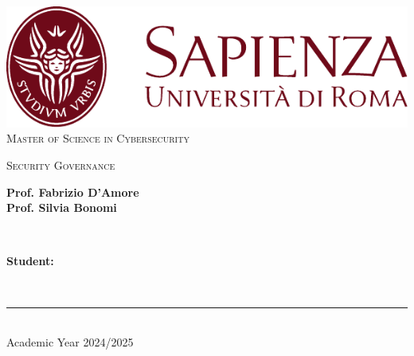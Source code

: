 \begin{titlepage}
	\centering
    \vspace*{0.5 cm}
    \includegraphics[scale = 0.75]{SapienzaLogo.pdf}\\[1.0 cm]	%

    \vspace*{-0.4cm}
    \textsc{\large Master of Science in Cybersecurity}\\[2.0 cm]	%
    \vspace*{1cm}

    { \fontsize{20.74pt}{18.5pt}\selectfont\bfseries \thetitle \par } %

    \vspace*{0.75cm}
    \textsc{\Large Security Governance}\\[0.5 cm] %

    \vspace*{2.6cm}
	\begin{minipage}{0.7\textwidth} %
		\begin{flushleft} \large
			\textbf{Prof. Fabrizio D'Amore}\\
            \textbf{Prof. Silvia Bonomi}
		\end{flushleft}
	\end{minipage}~
	\begin{minipage}{0.4\textwidth} %
		\begin{flushright} \large
		\begin{minipage}{1\textwidth}
		\begin{flushleft} \large
			\textbf{Student:} \\
			\theauthor
        \end{flushleft}
        \end{minipage}
		\end{flushright}
	\end{minipage}\\[3.85 cm]

    \vspace{2cm}
    \rule{\linewidth}{0.2 mm} \\[0.3 cm]
    \vspace*{-0.2cm}
    Academic Year 2024/2025
\end{titlepage}